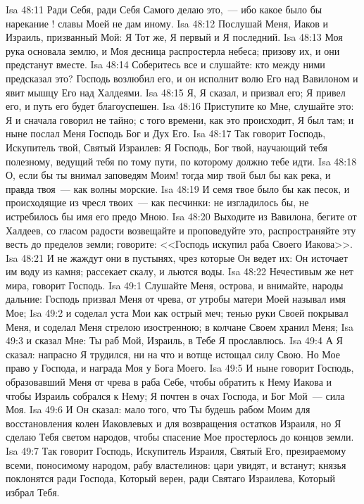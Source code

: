 \vs Isa 48:11 Ради Себя, ради Себя Самого делаю это,~--- ибо какое было бы нарекание ! славы Моей не дам иному.
\rsbpar\vs Isa 48:12 Послушай Меня, Иаков и Израиль, призванный Мой: Я Тот же, Я первый и Я последний.
\vs Isa 48:13 Моя рука основала землю, и Моя десница распростерла небеса; призову их, и они предстанут вместе.
\vs Isa 48:14 Соберитесь все и слушайте: кто между ними предсказал это? Господь возлюбил его, и он исполнит волю Его над Вавилоном и явит мышцу Его над Халдеями.
\vs Isa 48:15 Я, Я сказал, и призвал его; Я привел его, и путь его будет благоуспешен.
\vs Isa 48:16 Приступите ко Мне, слушайте это: Я и сначала говорил не тайно; с того времени, как это происходит, Я был там; и ныне послал Меня Господь Бог и Дух Его.
\rsbpar\vs Isa 48:17 Так говорит Господь, Искупитель твой, Святый Израилев: Я Господь, Бог твой, научающий тебя полезному, ведущий тебя по тому пути, по которому должно тебе идти.
\vs Isa 48:18 О, если бы ты внимал заповедям Моим! тогда мир твой был бы как река, и правда твоя~--- как волны морские.
\vs Isa 48:19 И семя твое было бы как песок, и происходящие из чресл твоих~--- как песчинки: не изгладилось бы, не истребилось бы имя его предо Мною.
\vs Isa 48:20 Выходите из Вавилона, бегите от Халдеев, со гласом радости возвещайте и проповедуйте это, распространяйте эту весть до пределов земли; говорите: <<Господь искупил раба Своего Иакова>>.
\vs Isa 48:21 И не жаждут они в пустынях, чрез которые Он ведет их: Он источает им воду из камня; рассекает скалу, и льются воды.
\vs Isa 48:22 Нечестивым же нет мира, говорит Господь.
\vs Isa 49:1 Слушайте Меня, острова, и внимайте, народы дальние: Господь призвал Меня от чрева, от утробы матери Моей называл имя Мое;
\vs Isa 49:2 и соделал уста Мои как острый меч; тенью руки Своей покрывал Меня, и соделал Меня стрелою изостренною; в колчане Своем хранил Меня;
\vs Isa 49:3 и сказал Мне: Ты раб Мой, Израиль, в Тебе Я прославлюсь.
\vs Isa 49:4 А Я сказал: напрасно Я трудился, ни на что и вотще истощал силу Свою. Но Мое право у Господа, и награда Моя у Бога Моего.
\vs Isa 49:5 И ныне говорит Господь, образовавший Меня от чрева в раба Себе, чтобы обратить к Нему Иакова и чтобы Израиль собрался к Нему; Я почтен в очах Господа, и Бог Мой~--- сила Моя.
\vs Isa 49:6 И Он сказал: мало того, что Ты будешь рабом Моим для восстановления колен Иаковлевых и для возвращения остатков Израиля, но Я сделаю Тебя светом народов, чтобы спасение Мое простерлось до концов земли.
\vs Isa 49:7 Так говорит Господь, Искупитель Израиля, Святый Его, презираемому всеми, поносимому народом, рабу властелинов: цари увидят, и встанут; князья поклонятся ради Господа, Который верен, ради Святаго Израилева, Который избрал Тебя.
